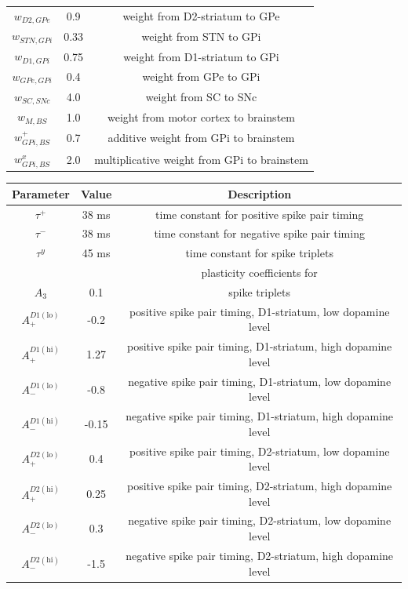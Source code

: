 \documentclass[a4paper]{scrreprt}
\begin{document}
\begin{center}
\begin{tabular}{ c  c  c }
$w_{D2,GPe}$ & 0.9 & weight from D2-striatum to GPe\\
$w_{STN,GPi}$ & 0.33 & weight from STN to GPi\\
$w_{D1,GPi}$ & 0.75 & weight from D1-striatum to GPi\\
$w_{GPe,GPi}$ & 0.4 & weight from GPe to GPi\\
$w_{SC, SNc}$ & 4.0 & weight from SC to SNc\\
$w_{M,BS}$ & 1.0 & weight from motor cortex to brainstem\\
$w_{GPi,BS}^+$ & 0.7 & additive weight from GPi to brainstem\\
$w_{GPi,BS}^x$ & 2.0 & multiplicative weight from GPi to brainstem\\
\hline
\end{tabular}
\label{tab:params_network}
\end{center}

\begin{center}
\begin{tabular}{ c  c  c}
\hline
Parameter & Value & Description\\
\hline
$\tau^+$ & 38 ms & time constant for positive spike pair timing\\
$\tau^-$ & 38 ms & time constant for negative spike pair timing\\
$\tau^y$ & 45 ms & time constant for spike triplets\\
\hline
&& plasticity coefficients for\\
$A_3$ & 0.1 & spike triplets\\
$A_+^{D1(\text{lo})}$ & -0.2 & positive spike pair timing, D1-striatum, low dopamine level\\
$A_+^{D1(\text{hi})}$ & 1.27 & positive spike pair timing, D1-striatum, high dopamine level\\
$A_-^{D1(\text{lo})}$ & -0.8 & negative spike pair timing, D1-striatum, low dopamine level\\
$A_-^{D1(\text{hi})}$ & -0.15 & negative spike pair timing, D1-striatum, high dopamine level\\
$A_+^{D2(\text{lo})}$ & 0.4 & positive spike pair timing, D2-striatum, low dopamine level\\
$A_+^{D2(\text{hi})}$ & 0.25 & positive spike pair timing, D2-striatum, high dopamine level\\
$A_-^{D2(\text{lo})}$ & 0.3 & negative spike pair timing, D2-striatum, low dopamine level\\
$A_-^{D2(\text{hi})}$ & -1.5 & negative spike pair timing, D2-striatum, high dopamine level\\
\hline
\end{tabular}
\label{tab:params_plasticity}
\end{center}
\end{document}
